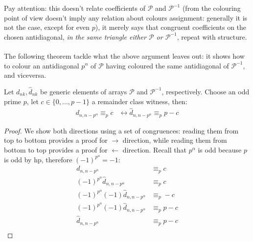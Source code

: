 Pay attention: this doesn't relate coefficients
of $\mathcal{P}$ and $\mathcal{P}^{-1}$ (from the colouring point of view 
doesn't imply any relation about colours assignment: generally it is not the case,
except for even $p$), it merely says that 
congruent coefficients on the chosen antidiagonal, \emph{in the same triangle
either $\mathcal{P}$ or $\mathcal{P}^{-1}$}, repeat with structure.
\\\\
The following theorem tackle what the above argument leaves out: it 
shows how to colour an antidiagonal $p^{\alpha}$ of $\mathcal{P}$
having coloured the same antidiagonal of $\mathcal{P}^{-1}$, and viceversa.

\begin{theorem}
    Let $d_{nk}, \hat{d}_{nk}$ be generic elements of arrays $\mathcal{P}$ and $\mathcal{P}^{-1}$,
    respectively. Choose an odd prime $p$, let $c\in \lbrace 0, \ldots, p-1 \rbrace$ a remainder class
    witness, then:
    \begin{displaymath}
        \begin{split}
            d_{n,n-p^{\alpha}} \equiv_{p} c &\leftrightarrow \hat{d}_{n,n-p^{\alpha}} \equiv_{p} p-c
        \end{split}
    \end{displaymath}
\end{theorem}
\begin{proof}
We show both directions using a set of congruences: reading them from top to bottom provides a 
proof for $\rightarrow$ direction, while reading them from bottom to top provides a proof for 
$\leftarrow$ direction. Recall that $p^\alpha$ is odd because $p$ is odd by hp, therefore $(-1)^{p^\alpha} = -1$:
\begin{displaymath}
    \begin{split}
        d_{n,n-p^{\alpha}} &\equiv_{p} c \\
        (-1)^{p^\alpha}\hat{d}_{n,n-p^{\alpha}} &\equiv_{p} c \\
        (-1)^{p^\alpha }(-1)\hat{d}_{n,n-p^{\alpha}} &\equiv_{p} -c \\
        (-1)^{p^\alpha }(-1)\hat{d}_{n,n-p^{\alpha}} &\equiv_{p} p -c \\
        \hat{d}_{n,n-p^{\alpha}} &\equiv_{p} p -c \\
    \end{split}
\end{displaymath}
\end{proof}
